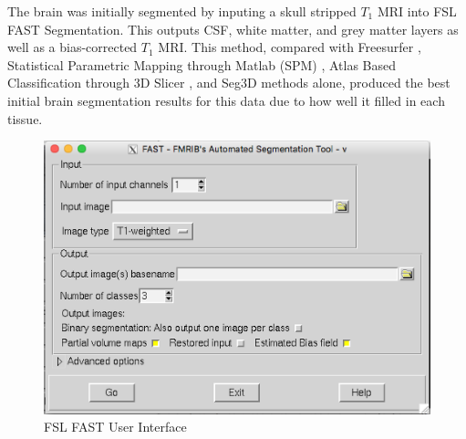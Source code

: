 The brain was initially segmented by inputing a skull stripped $T_1$ MRI into FSL FAST Segmentation. This outputs CSF, white matter, and grey matter layers as well as a bias-corrected $T_1$ MRI. This method, compared with Freesurfer \cite{ref:freesurf}, Statistical Parametric Mapping through Matlab (SPM) \cite{ref:spm}, Atlas Based Classification through 3D Slicer \cite{ref:abc}, and Seg3D methods alone, produced the best initial brain segmentation results for this data due to how well it filled in each tissue. 
\begin{figure}[H]
    \centering
    \includegraphics[width=.8\textwidth]{Figures/FSL_FAST}
    \caption{FSL FAST User Interface }
    \label{fig:fslfast}
\end{figure}

